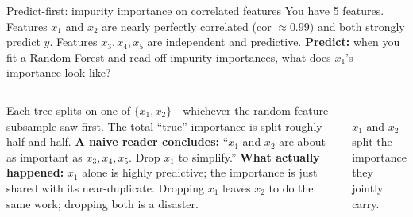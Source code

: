 \documentclass[aspectratio=169]{beamer}
\begin{document}
\begin{frame}{Predict-first: impurity importance on correlated features}
  You have 5 features. Features $x_1$ and $x_2$ are nearly perfectly correlated (cor $\approx 0.99$) and both strongly predict $y$. Features $x_3, x_4, x_5$ are independent and predictive.
  \vfill
  \pause
  \textbf{Predict:} when you fit a Random Forest and read off impurity importances, what does $x_1$'s importance look like?
  \pause
  \vfill
  \begin{columns}[T]
    \footnotesize
    Each tree splits on one of $\{x_1, x_2\}$ - whichever the random feature subsample saw first. The total ``true'' importance is split roughly half-and-half.
    \vskip 4pt
    \textbf{A naive reader concludes:} ``$x_1$ and $x_2$ are about as important as $x_3, x_4, x_5$. Drop $x_1$ to simplify.''
    \vskip 4pt
    \textbf{What actually happened:} $x_1$ alone is highly predictive; the importance is just shared with its near-duplicate. Dropping $x_1$ leaves $x_2$ to do the same work; dropping both is a disaster.
    \begin{center}
      \\
      \scriptsize $x_1$ and $x_2$ split the importance they jointly carry.
    \end{center}
  \end{columns}
\end{frame}
\end{document}
